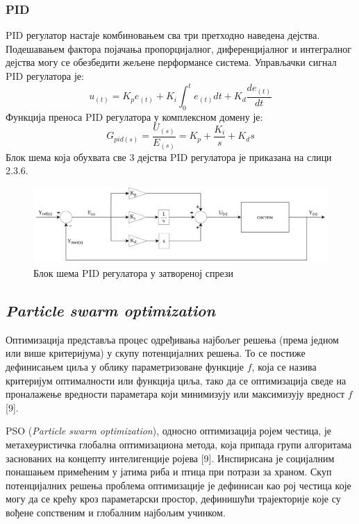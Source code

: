 \documentclass[12pt]{article}
\begin{document}
\subsubsection{PID}
PID регулатор настаје комбиновањем сва три претходно наведена дејства. Подешавањем фактора појачања пропорцијалног, диференцијалног и интегралног дејства могу се обезбедити жељене перформансе система.
Управљачки сигнал PID регулатора је:
\begin{equation}
    u_{(t)} = K_p e_{(t)} + K_i\int_{0}^{t}e_{(t)}dt + K_d\dfrac{de_{(t)}}{dt}
\end{equation}
Функција преноса PID регулатора у комплексном домену је:
\begin{equation}
    G_{pid(s)} = \dfrac{U_{(s)}}{E_{(s)}} = K_p + \dfrac{K_i}{s} + K_ds
\end{equation}
Блок шема која обухвата све 3 дејства PID регулатора је приказана на слици 2.3.6.
\begin{figure}[H]
    \centering
    \includegraphics[width=18cm]{figures/pid.drawio.png}
    \caption{Блок шема PID регулатора у затвореној спрези}
    \label{fig:PID_затворена_спрега}
\end{figure}

\subsection{\textit{Particle swarm optimization}}
Оптимизација представља процес одређивања најбољег решења (према једном или више критеријума) у скупу потенцијалних решења. То се постиже дефинисањем циља у облику параметризоване функције $f$, која се назива критеријум оптималности или функција циља, тако да се оптимизација сведе на проналажење вредности параметара који минимизују или максимизују вредност $f$ [9].

PSO (\textit{Particle swarm optimization}), односно оптимизација ројем честица, је метахеуристичка глобална оптимизациона метода, која припада групи алгоритама заснованих на концепту интелигенције ројева [9]. Инспирисана је социјалним понашањем примећеним у јатима риба и птица при потрази за храном. Скуп потенцијалних решења проблема оптимизације је дефинисан као рој честица које могу да се крећу кроз параметарски простор, дефинишући трајекторије које су вођене сопственим и глобалним најбољим учинком.
\end{document}
